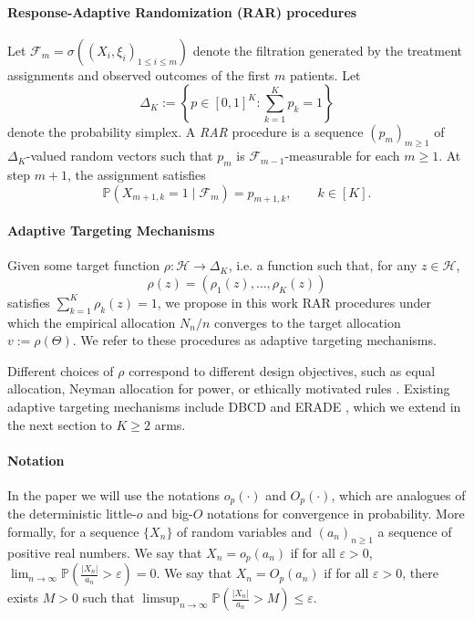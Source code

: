 \paragraph*{Response-Adaptive Randomization (RAR) procedures}

Let $\mathcal{F}_m = \sigma\!\left((X_i,\xi_i)_{1 \le i \le m}\right)$ 
denote the filtration generated by the treatment assignments and observed 
outcomes of the first $m$ patients. Let
\[
\Delta_K := \left\{p \in [0,1]^K : \sum_{k=1}^K p_k = 1\right\}
\]
denote the probability simplex. A \textit{RAR} procedure is a sequence
\((p_m)_{m\ge 1}\) of \(\Delta_K\)-valued random vectors such that
\(p_m\) is \(\mathcal F_{m-1}\)-measurable for each \(m\ge 1\).
At step \(m+1\), the assignment satisfies
\[
\mathbb P(X_{m+1,k}=1\mid\mathcal F_m)=p_{m+1,k},
\qquad k\in[K].
\]

\paragraph*{Adaptive Targeting Mechanisms} Given some target function $\rho : \mathcal{H} \rightarrow \Delta_K$, i.e. a function such that, for any $z \in \mathcal{H}$,
\[
\rho(z) = (\rho_1(z), \ldots, \rho_K(z))
\]
satisfies $\sum_{k=1}^{K}\rho_{k}(z)=1$, we propose in this work RAR procedures under which the empirical allocation $N_n/n$ converges to the target allocation $v := \rho(\Theta)$. We refer to these procedures as adaptive targeting mechanisms.

Different choices of $\rho$ correspond to different design objectives, such as equal allocation, Neyman allocation for power, or ethically motivated rules \citep{pin2024response}.
Existing adaptive targeting mechanisms include DBCD \citep{hu2004asymptotic} and ERADE \citep{hu2006theory}, which we extend in the next section to $K \geq 2$ arms.


\paragraph*{Notation}
In the paper we will use the notations $o_p(\cdot)$ and $O_p(\cdot)$, which are analogues of the deterministic little-$o$ and big-$O$ notations for convergence in probability.
More formally, for a sequence $\{X_n\}$ of random variables and $\left(a_n\right)_{n \geq 1}$ a sequence of positive real numbers.
We say that $X_n = o_p(a_n)$ if for all $\varepsilon > 0$, \(\lim_{n \to \infty} \mathbb{P}\!\left( \frac{|X_n|}{a_n} > \varepsilon \right) = 0.\)
We say that $X_n = O_p(a_n)$ if for all $\varepsilon > 0$, there exists $M > 0$ such that \(\limsup_{n \to \infty} \mathbb{P}\!\left( \frac{|X_n|}{a_n} > M \right) \leq \varepsilon.\)		
	
